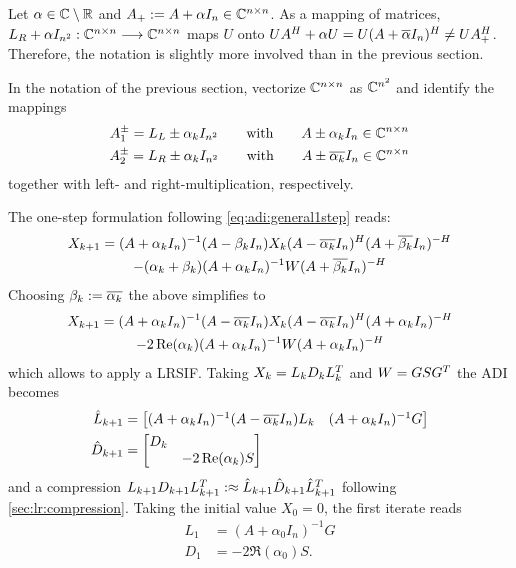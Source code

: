 \begin{remark}
  Let $\alpha\in\mathbb{C}\setminus\mathbb{R}$ and $A_+ := A+\alpha I_n \in\mathbb{C}^{n\times n}$.
  As a mapping of matrices,
  $L_R + \alpha I_{n^2} : \mathbb{C}^{n\times n} \longrightarrow \mathbb{C}^{n\times n}$ maps $U$ onto
  $
    U A^\HT + \alpha U =
    U(A+\conj{\alpha} I_n)^\HT \neq
    U A_+^\HT
  $.
  Therefore, the notation is slightly more involved than in the previous section.

  In the notation of the previous section,
  vectorize $\mathbb{C}^{n\times n}$ as $\mathbb{C}^{n^2}$ and identify the mappings
  \begin{gather*}
    A_1^\pm = L_L \pm \alpha_k I_{n^2}
    \qquad\text{with}\qquad
    A \pm \alpha_k I_n \in\Cnn \\
    A_2^\pm = L_R \pm \alpha_k I_{n^2}
    \qquad\text{with}\qquad
    A \pm \conj{\alpha_k} I_n \in\Cnn
  \end{gather*}
  together with left- and right-multiplication, respectively.
\end{remark}

The one-step formulation following \eqref{eq:adi:general1step} reads:
\begin{multline}
  X_{k+1} =
  (A + \alpha_k I_n)^{-1}
  (A - \beta_k I_n)
  X_k
  (A - \conj{\alpha_k} I_n)^\HT
  (A + \conj{\beta_k} I_n)^{-H}
  \\
  - (\alpha_k + \beta_k)
  (A + \alpha_k I_n)^{-1}
  W
  (A + \conj{\beta_k} I_n)^{-\HT}
\end{multline}
Choosing $\beta_k := \conj{\alpha_k}$
the above simplifies to
\begin{multline}
  X_{k+1} =
  (A + \alpha_k I_n)^{-1}
  (A - \conj{\alpha_k} I_n)
  X_k
  (A - \conj{\alpha_k} I_n)^\HT
  (A + \alpha_k I_n)^{-H}
  \\
  - 2\Re(\alpha_k)
  (A + \alpha_k I_n)^{-1}
  W
  (A + \alpha_k I_n)^{-\HT}
\end{multline}
which allows to apply a \ac{LRSIF}.
Taking $X_k = L_k D_k L_k^T$ and $W = GSG^T$
the \ac{ADI} becomes
\begin{align*}
  \hat L_{k+1} &= \begin{bmatrix}
    (A+\alpha_k I_n)^{-1} (A - \conj{\alpha_k} I_n) L_k &
    (A+\alpha_k I_n)^{-1} G
  \end{bmatrix} \\
  \hat D_{k+1} &= \begin{bmatrix}
    D_k \\
    & -2\Re(\alpha_k) S
  \end{bmatrix}
\end{align*}
and a compression $L_{k+1} D_{k+1} L_{k+1}^T :\approx \hat L_{k+1} \hat D_{k+1} \hat L_{k+1}^T$
following \autoref{sec:lr:compression}.
Taking the initial value $X_0 = 0$, the first iterate reads
\begin{align*}
  L_1 &= (A+\alpha_0 I_n)^{-1} G \\
  D_1 &= -2\Re(\alpha_0) S
  .
\end{align*}

